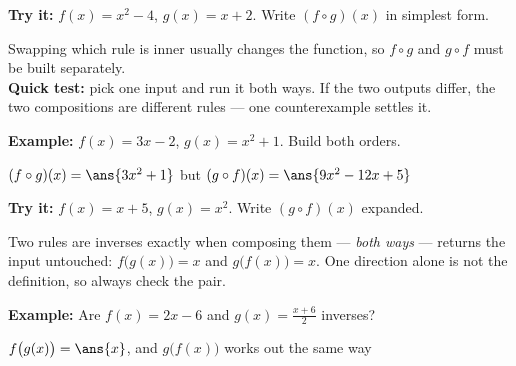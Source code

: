 \documentclass[12pt]{article}
\begin{document}
\begin{tryitbox}
\textbf{Try it:} \quad $f(x) = x^2 - 4$, $g(x) = x + 2$. Write $(f \circ g)(x)$
in simplest form.\\[2pt]
\end{tryitbox}


\begin{formulabox}
Swapping which rule is inner usually changes the function, so
$f \circ g$ and $g \circ f$ must be built separately.\\[3pt]
\textbf{Quick test:} pick one input and run it both ways. If the two outputs
differ, the two compositions are different rules --- one counterexample
settles it.
\end{formulabox}

\begin{examplebox}
\textbf{Example:} \quad $f(x) = 3x - 2$, $g(x) = x^2 + 1$. Build both orders.

$(f \circ g)(x) = \ans{3x^2 + 1}$ \quad but \quad $(g \circ f)(x) = \ans{9x^2 - 12x + 5}$
\end{examplebox}

\begin{tryitbox}
\textbf{Try it:} \quad $f(x) = x + 5$, $g(x) = x^2$. Write $(g \circ f)(x)$
expanded.\\[2pt]
\end{tryitbox}


\begin{formulabox}
Two rules are inverses exactly when composing them --- \emph{both ways} ---
returns the input untouched: $f\big(g(x)\big) = x$ and $g\big(f(x)\big) = x$.
One direction alone is not the definition, so always check the pair.
\end{formulabox}

\begin{examplebox}
\textbf{Example:} \quad Are $f(x) = 2x - 6$ and $g(x) = \frac{x+6}{2}$ inverses?

$f\big(g(x)\big) = \ans{x}$, and $g\big(f(x)\big)$ works out the same way
\end{examplebox}
\end{document}
